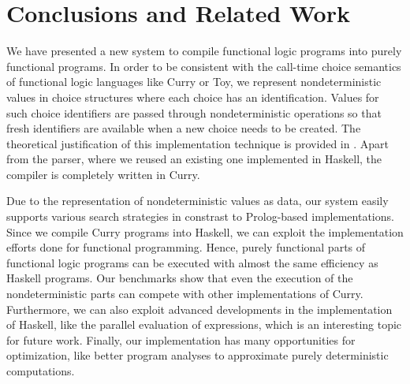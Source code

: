 \documentclass{llncs}
\begin{document}
\section{Conclusions and Related Work}
\label{sec:Conclusions}

We have presented a new system to compile functional logic programs
into purely functional programs.
In order to be consistent with the call-time choice semantics
of functional logic languages like Curry or Toy,
we represent nondeterministic values
in choice structures where each choice has an identification.
Values for such choice identifiers are passed through
nondeterministic operations so that fresh identifiers are available
when a new choice needs to be created.
The theoretical justification of this implementation technique
is provided in \cite{Brassel11Thesis}.
Apart from the parser, where we reused an existing one
implemented in Haskell, the compiler is completely written in Curry.

Due to the representation of nondeterministic values as data,
our system easily supports various search strategies
in constrast to Prolog-based implementations.
Since we compile Curry programs into Haskell,
we can exploit the implementation efforts done
for functional programming.
Hence, purely functional parts of functional logic programs
can be executed with almost the same efficiency as Haskell programs.
Our benchmarks show that even the execution of the
nondeterministic parts can compete with other
implementations of Curry.
Furthermore, we can also exploit advanced developments
in the implementation of Haskell, like the parallel evaluation of
expressions, which is an interesting topic for future work.
Finally, our implementation has many opportunities
for optimization, like
better program analyses to approximate purely deterministic computations.



\end{document}
